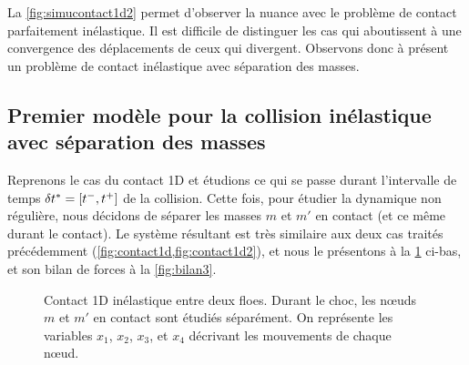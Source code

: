 \noindent La \cref{fig:simucontact1d2} permet d'observer la nuance avec le problème de contact parfaitement inélastique. Il est difficile de distinguer les cas qui aboutissent à une convergence des déplacements de ceux qui divergent. Observons donc à présent un problème de contact inélastique avec séparation des masses.






\subsection{Premier modèle pour la collision inélastique avec séparation des masses}
\label{subsubsec:colinesepma}

Reprenons le cas du contact 1D et étudions ce qui se passe durant l'intervalle de temps $\delta t^{*} = [t^{-}, t^{+}]$ de la collision. Cette fois, pour étudier la dynamique non régulière, nous décidons de séparer les masses $m$ et $m'$ en contact (et ce même durant le contact). Le système résultant est très similaire aux deux cas traités précédemment (\cref{fig:contact1d,fig:contact1d2}), et nous le présentons à la \cref{fig:contact1d3} ci-bas, et son bilan de forces à la \cref{fig:bilan3}.

\begin{figure}[!h]
    \centering
    \caption{Contact 1D inélastique entre deux floes. Durant le choc, les nœuds $m$ et $m'$ en contact sont étudiés séparément. On représente les variables $x_1$, $x_2$, $x_3$, et $x_4$ décrivant les mouvements de chaque n\oe{}ud.}
    \label{fig:contact1d3}
\end{figure}


